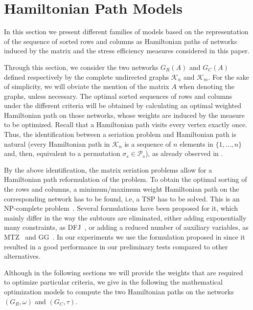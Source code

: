 \documentclass[a4paper,11pt, reqno]{amsart}
\def\Per{\mathcal{P}}
\def\K{\mathcal{K}}
\begin{document}
\section{Hamiltonian Path Models}  \label{sec:3}

In this section we present different families of models based on the representation of the sequence of sorted rows and columns as Hamiltonian paths of networks induced by the matrix and the stress efficiency measures considered in this paper.

Through this section, we consider the two networks $G_R(A)$ and $G_C(A)$ defined respectively by the complete undirected graphs $\K_n$ and $\K_m$. For the sake of simplicity, we will obviate the mention of the matrix $A$ when denoting the graphs, unless necessary. The optimal sorted sequences of rows and columns under the different criteria will be obtained by calculating an optimal weighted Hamiltonian path on those networks, whose weights are induced by the measure to be optimized. Recall that a Hamiltonian path  visits every vertex exactly once. Thus, the identification between a seriation problem and Hamiltonian path is natural (every Hamiltonian path in $\K_n$ is a sequence of $n$ elements in 
$\{1,\ldots, n\}$ and, then, equivalent to a permutation $\sigma_s \in \Per_s$), as already observed in  \cite{laporte1978seriation,brusco2001compact}.


By the above identification, the matrix seriation problems allow for a Hamiltonian path reformulation of the problem.
To obtain the optimal sorting of the rows and columns, a minimum/maximum weight Hamiltonian path on the corresponding network
has to be found, i.e, a TSP has to be solved. This is an NP-complete problem~\citep{garey1979computers}. 
Several formulations have been proposed for it, which mainly differ in the way the subtours are eliminated, 
either adding exponentially many constraints, as DFJ~\citep{dantzig1954solution}, or adding a reduced number of 
auxiliary variables, as MTZ~\citep{miller1960integer} and GG~\citep{gavish1978travelling}. 
In our experiments we use the formulation proposed in \cite{gavish1978travelling} since it resulted in a good performance in our preliminary tests compared to other alternatives. 


Although in the following sections we will provide the weights that are required to optimize particular criteria, 
we give in the following the mathematical optimization models to compute the two Hamiltonian paths on the networks 
$(G_R,\omega)$ and $(G_C,\tau)$. 
\end{document}

